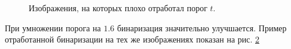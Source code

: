 \documentclass[12pt,fleqn]{article}
\begin{document}
\begin{figure}[h]
\begin{minipage}[h]{0.49\linewidth}
\end{minipage}
\caption{Изображения, на которых плохо отработал порог $t$.}
\label{Image1}
\end{figure}

При умножении порога на $1.6$ бинаризация значительно улучшается. Пример отработанной бинаризации на тех же изображениях показан на рис. \hyperref[Image2]{2}
\end{document}
